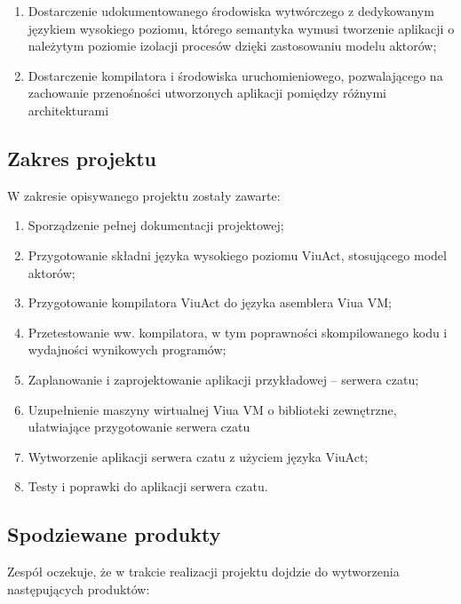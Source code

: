 \documentclass[11pt,oneside,a4paper,titlepage,onecolumn]{article}
\begin{document}
\begin{enumerate}
	\item Dostarczenie udokumentowanego środowiska wytwórczego z dedykowanym językiem wysokiego poziomu, którego semantyka wymusi tworzenie aplikacji o należytym poziomie izolacji procesów dzięki zastosowaniu modelu aktorów;
	\item Dostarczenie kompilatora i środowiska uruchomieniowego, pozwalającego na zachowanie przenośności utworzonych aplikacji pomiędzy różnymi architekturami
\end{enumerate}
    
\subsection{Zakres projektu}

W zakresie opisywanego projektu zostały zawarte:

\begin{enumerate}
	\item Sporządzenie pełnej dokumentacji projektowej;
    \item Przygotowanie składni języka wysokiego poziomu ViuAct, stosującego model aktorów;
    \item Przygotowanie kompilatora ViuAct do języka asemblera Viua VM;
    \item Przetestowanie ww. kompilatora, w tym poprawności skompilowanego kodu i wydajności wynikowych programów;
    \item Zaplanowanie i zaprojektowanie aplikacji przykładowej – serwera czatu;
    \item Uzupełnienie maszyny wirtualnej Viua VM o biblioteki zewnętrzne, ułatwiające przygotowanie serwera czatu
    \item Wytworzenie aplikacji serwera czatu z użyciem języka ViuAct;
    \item Testy i poprawki do aplikacji serwera czatu.
\end{enumerate}

\subsection{Spodziewane produkty}

Zespół oczekuje, że w trakcie realizacji projektu dojdzie do wytworzenia następujących produktów:
\end{document}
